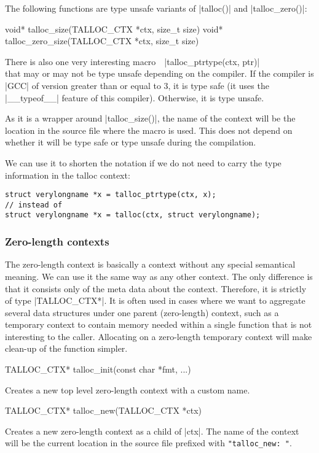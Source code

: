 The following functions are type unsafe variants of |talloc()| and
|talloc_zero()|:

\begin{funcproto}
void* talloc_size(TALLOC_CTX *ctx, size_t size)
void* talloc_zero_size(TALLOC_CTX *ctx, size_t size)
\end{funcproto}
\funclistend
There is also one very interesting macro~~|talloc_ptrtype(ctx, ptr)| \\ that
may or may not be type unsafe depending on the compiler. If the compiler is |GCC| of
version greater than or equal to 3, it is type safe (it uses the |__typeof__|
feature of this compiler). Otherwise, it is type unsafe.

As it is a wrapper around |talloc_size()|, the name of the context will be the
location in the source file where the macro is used. This does not depend on
whether it will be type safe or type unsafe during the compilation.

We can use it to shorten the notation if we do not need to carry the type
information in the talloc context:

\begin{lstlisting}[caption={talloc_ptrtype(ctx, ptr)},label=lst:talloc_ptrtype]
struct verylongname *x = talloc_ptrtype(ctx, x);
// instead of
struct verylongname *x = talloc(ctx, struct verylongname);
\end{lstlisting}

\subsubsection{Zero-length contexts}

The zero-length context is basically a context without any special semantical
meaning. We can use it the same way as any other context. The only difference
is that it consists only of the meta data about the context. Therefore, it is
strictly of type |TALLOC_CTX*|. It is often used in cases where we want to
aggregate several data structures under one parent (zero-length) context, such
as a temporary context to contain memory needed within a single function that
is not interesting to the caller. Allocating on a zero-length temporary context
will make clean-up of the function simpler.

\begin{funcproto}
TALLOC_CTX* talloc_init(const char *fmt, ...)
\end{funcproto}
\begin{funcdesc}
Creates a new top level zero-length context with a custom name.
\end{funcdesc}
\begin{funcproto}
TALLOC_CTX* talloc_new(TALLOC_CTX *ctx)
\end{funcproto}
\begin{funcdesc}
Creates a new zero-length context as a child of |ctx|. The name of the context
will be the current location in the source file prefixed with
\lstinline[showspaces=true]{"talloc_new: "}.
\end{funcdesc}

